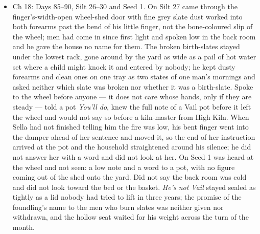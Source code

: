 \documentclass{design/chronicle}
\begin{document}
{\begin{itemize}[leftmargin=1.4em,itemsep=1pt,topsep=3pt,parsep=0pt]
\end{itemize}

\begin{itemize}[leftmargin=1.4em,itemsep=1pt,topsep=3pt,parsep=0pt]

\item Ch 18: Days 85–90, Silt 26–30 and Seed 1. On Silt 27 came through the finger’s-width-open wheel-shed door with fine grey slate dust worked into both forearms past the bend of his little finger, not the bone-coloured slip of the wheel; men had come in since first light and spoken low in the back room and he gave the house no name for them. The broken birth-slates stayed under the lowest rack, gone around by the yard as wide as a pail of hot water set where a child might knock it and entered by nobody; he kept dusty forearms and clean ones on one tray as two states of one man’s mornings and asked neither which slate was broken nor whether it was a birth-slate. Spoke to the wheel before anyone --- it does not care whose hands, only if they are steady --- told a pot \emph{You’ll do}, knew the full note of a Vail pot before it left the wheel and would not say so before a kiln-master from High Kiln. When Sella had not finished telling him the fire was low, his bent finger went into the damper ahead of her sentence and moved it, so the end of her instruction arrived at the pot and the household straightened around his silence; he did not answer her with a word and did not look at her. On Seed 1 was heard at the wheel and not seen: a low note and a word to a pot, with no figure coming out of the shed onto the yard. Did not say the back room was cold and did not look toward the bed or the basket. \emph{He’s not Vail} stayed sealed as tightly as a lid nobody had tried to lift in three years; the promise of the foundling’s name to the men who burn slates was neither given nor withdrawn, and the hollow seat waited for his weight across the turn of the month.

\end{itemize}

\begin{itemize}[leftmargin=1.4em,itemsep=1pt,topsep=3pt,parsep=0pt]


\end{itemize}}
\end{document}
